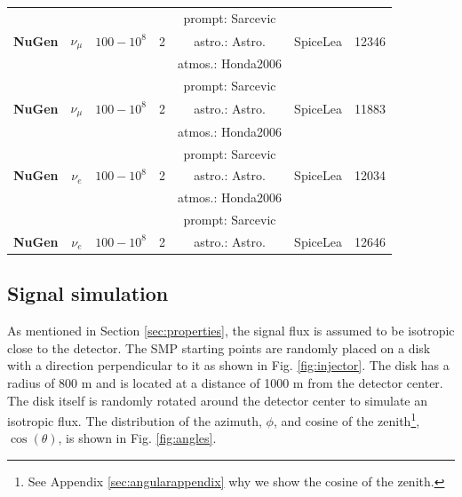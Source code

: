 \begin{table}[]
{\begin{tabular}{|l |c|c|c|c|c|r|}
 &  &  &  & prompt: Sarcevic &  &  \\
\multirow{-3}{*}{\textbf{NuGen}} & \multirow{-3}{*}{$\nu_\mu$} & \multirow{-3}{*}{$100 - 10^8$} & \multirow{-3}{*}{2} & astro.: Astro. & \multirow{-3}{*}{SpiceLea} & \multirow{-3}{*}{12346} \\ \hline
 &  &  &  & atmos.: Honda2006 &  &  \\
 &  &  &  & prompt: Sarcevic &  &  \\
\multirow{-3}{*}{\textbf{NuGen}} & \multirow{-3}{*}{$\nu_\mu$} & \multirow{-3}{*}{$100 - 10^8$} & \multirow{-3}{*}{2} & astro.: Astro. & \multirow{-3}{*}{SpiceLea} & \multirow{-3}{*}{11883} \\ \hline
 &  &  &  & atmos.: Honda2006 &  &  \\
 &  &  &  & prompt: Sarcevic &  &  \\
\multirow{-3}{*}{\textbf{NuGen}} & \multirow{-3}{*}{$\nu_e$} & \multirow{-3}{*}{$100 - 10^8$} & \multirow{-3}{*}{2} & astro.: Astro. & \multirow{-3}{*}{SpiceLea} & \multirow{-3}{*}{12034} \\ \hline
 &  &  &  & atmos.: Honda2006 &  &  \\
 &  &  &  & prompt: Sarcevic &  &  \\
\multirow{-3}{*}{\textbf{NuGen}} & \multirow{-3}{*}{$\nu_e$} & \multirow{-3}{*}{$100 - 10^8$} & \multirow{-3}{*}{2} & astro.: Astro. & \multirow{-3}{*}{SpiceLea} & \multirow{-3}{*}{12646} \\ \hline
\end{tabular}%
}
\end{table}

\subsection{Signal simulation}
As mentioned in Section \ref{sec:properties}, the signal flux is assumed to be isotropic close to the detector. The SMP starting points are randomly placed on a disk with a direction perpendicular to it as shown in Fig. \ref{fig:injector}. The disk has a radius of 800 m and is located at a distance of 1000 m from the detector center. The disk itself is randomly rotated around the detector center to simulate an isotropic flux. The distribution of the azimuth, $\phi$, and cosine of the zenith\footnote{See Appendix \ref{sec:angularappendix} why we show the cosine of the zenith.}, $\cos(\theta)$, is shown in Fig. \ref{fig:angles}.\\


